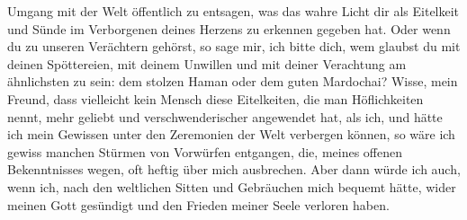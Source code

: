 Umgang mit der Welt öffentlich zu entsagen, was das wahre Licht dir als
Eitelkeit und Sünde im Verborgenen deines Herzens zu
erkennen gegeben hat. Oder
wenn du zu unseren Verächtern gehörst, so sage mir, ich bitte dich, wem glaubst
du mit deinen Spöttereien, mit deinem Unwillen und mit deiner Verachtung am
ähnlichsten zu sein: dem stolzen Haman 
 oder dem guten Mardochai? Wisse, mein
Freund, dass vielleicht kein Mensch diese Eitelkeiten, die man Höflichkeiten
nennt, mehr geliebt und verschwenderischer angewendet hat, als ich, und hätte
ich mein Gewissen unter den Zeremonien der Welt verbergen können, so wäre ich
gewiss manchen Stürmen von Vorwürfen entgangen, die, meines offenen
Bekenntnisses
wegen, oft heftig über mich ausbrechen. Aber dann würde ich auch, wenn ich, nach
den weltlichen Sitten und Gebräuchen mich bequemt
hätte, wider meinen Gott
gesündigt und den Frieden meiner Seele verloren haben.

\medskip

